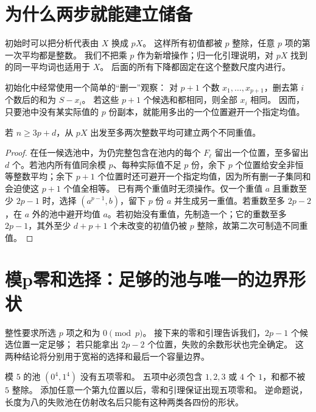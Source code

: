\section{为什么两步就能建立储备}
初始时可以把分析代表由 $X$ 换成 $pX$。
这样所有初值都被 $p$ 整除，任意 $p$ 项的第一次平均都是整数。
我们不把乘 $p$ 作为新增操作；归一化引理说明，对 $pX$ 找到的同一平均词也适用于 $X$。
后面的所有下降都固定在这个整数尺度内进行。

初始化中经常使用一个简单的“删一”观察：
对 $p+1$ 个数 $x_1,\ldots,x_{p+1}$，删去第 $i$ 个数后的和为 $S-x_i$。
若这些 $p+1$ 个候选和都相同，则全部 $x_i$ 相同。
因而，只要池中没有某实际值的 $p$ 份副本，就能用多出的一个位置避开一个指定均值。

\begin{lemma}[建立两个不同重值]\label{lem:initialize}
若 $n\ge3p+d$，从 $pX$ 出发至多两次整数平均可建立两个不同重值。
\end{lemma}
\begin{proof}
在任一候选池中，为仍完整包含在池内的每个 $F_\ell$ 留出一个位置，至多留出 $d$ 个。若池内所有值同余模 $p$、每种实际值不足 $p$ 份，余下 $p$ 个位置给安全非恒等整数平均；余下 $p+1$ 个位置时还可避开一个指定均值，因为所有删一子集同和会迫使这 $p+1$ 个值全相等。
已有两个重值时无须操作。仅一个重值 $a$ 且重数至少 $2p-1$ 时，选择 $(a^{p-1},b)$，留下 $p$ 份 $a$ 并生成另一重值。若重数至多 $2p-2$，在 $a$ 外的池中避开均值 $a$。若初始没有重值，先制造一个；它的重数至多 $2p-1$，其外至少 $d+p+1$ 个未改变的初值仍被 $p$ 整除，故第二次可制造不同重值。
\end{proof}


\section{模p零和选择：足够的池与唯一的边界形状}
整性要求所选 $p$ 项之和为 $0\pmod p$。
接下来的零和引理告诉我们，$2p-1$ 个候选位置一定足够；
若只能拿出 $2p-2$ 个位置，失败的余数形状也完全确定。
这两种结论将分别用于宽裕的选择和最后一个容量边界。

\begin{example}[五平均的边界池]
模 $5$ 的池 $(0^4,1^4)$ 没有五项零和。
五项中必须包含 $1,2,3$ 或 $4$ 个 $1$，和都不被 $5$ 整除。
添加任意一个第九位置以后，零和引理保证出现五项零和。
逆命题说，长度为八的失败池在仿射改名后只能有这种两类各四份的形状。
\end{example}

